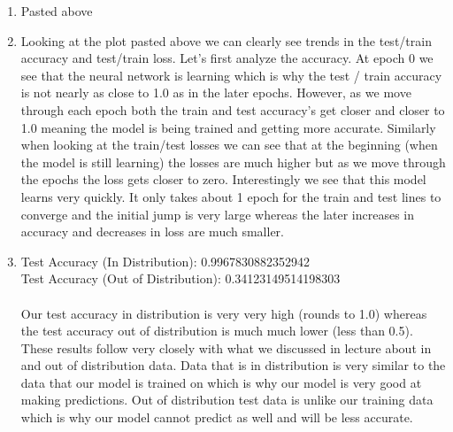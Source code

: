 \documentclass[submit]{harvardml}
\begin{document}
\begin{enumerate}
    \item Pasted above
    \item Looking at the plot pasted above we can clearly see trends in the test/train accuracy and test/train loss. Let's first analyze the accuracy. At epoch 0 we see that the neural network is learning which is why the test / train accuracy is not nearly as close to 1.0 as in the later epochs. However, as we move through each epoch both the train and test accuracy's get closer and closer to 1.0 meaning the model is being trained and getting more accurate. Similarly when looking at the train/test losses we can see that at the beginning (when the model is still learning) the losses are much higher but as we move through the epochs the loss gets closer to zero. Interestingly we see that this model learns very quickly. It only takes about 1 epoch for the train and test lines to converge and the initial jump is very large whereas the later increases in accuracy and decreases in loss are much smaller.\\
    \item
    Test Accuracy (In Distribution): 0.9967830882352942\\
    Test Accuracy (Out of Distribution): 0.34123149514198303\\
    \\
    Our test accuracy in distribution is very very high (rounds to 1.0) whereas the test accuracy out of distribution is much much lower (less than 0.5). These results follow very closely with what we discussed in lecture about in and out of distribution data. Data that is in distribution is very similar to the data that our model is trained on which is why our model is very good at making predictions. Out of distribution test data is unlike our training data which is why our model cannot predict as well and will be less accurate.
\end{enumerate}

\end{document}
